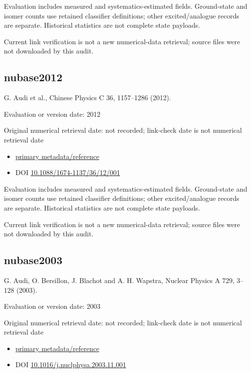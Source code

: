 \documentclass[
  11pt,
  letterpaper,
]{article}
\providecommand{\tightlist}{%
  \setlength{\itemsep}{0pt}\setlength{\parskip}{0pt}}
\begin{document}
Evaluation includes measured and systematics-estimated fields.
Ground-state and isomer counts use retained classifier definitions;
other excited/analogue records are separate. Historical statistics are
not complete state payloads.

Current link verification is not a new numerical-data retrieval; source
files were not downloaded by this audit.

\subsection{nubase2012}\label{nubase2012}

G. Audi et al., Chinese Physics C 36, 1157--1286 (2012).

Evaluation or version date: 2012

Original numerical retrieval date: not recorded; link-check date is not
numerical retrieval date

\begin{itemize}
\tightlist
\item
  \href{https://cpc.ihep.ac.cn/article/doi/10.1088/1674-1137/36/12/001}{primary
  metadata/reference}
\item
  DOI
  \href{https://doi.org/10.1088/1674-1137/36/12/001}{10.1088/1674-1137/36/12/001}
\end{itemize}

Evaluation includes measured and systematics-estimated fields.
Ground-state and isomer counts use retained classifier definitions;
other excited/analogue records are separate. Historical statistics are
not complete state payloads.

Current link verification is not a new numerical-data retrieval; source
files were not downloaded by this audit.

\subsection{nubase2003}\label{nubase2003}

G. Audi, O. Bersillon, J. Blachot and A. H. Wapstra, Nuclear Physics A
729, 3--128 (2003).

Evaluation or version date: 2003

Original numerical retrieval date: not recorded; link-check date is not
numerical retrieval date

\begin{itemize}
\tightlist
\item
  \href{https://amdc.impcas.ac.cn/nubase/nubase2003/nubtab03.asc}{primary
  metadata/reference}
\item
  DOI
  \href{https://doi.org/10.1016/j.nuclphysa.2003.11.001}{10.1016/j.nuclphysa.2003.11.001}
\end{itemize}
\end{document}
